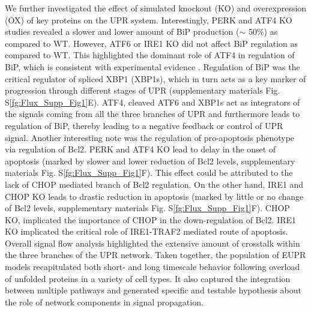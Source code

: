 \documentclass[12pt]{article}
\begin{document}
We further investigated the effect of simulated knockout (KO) and overexpression (OX) of key proteins on the UPR system. Interestingly, PERK and ATF4 KO studies revealed a slower and lower amount of BiP production ($\sim$ 50\%) as compared to WT. However, ATF6 or IRE1 KO did not affect BiP regulation as compared to WT. This highlighted the dominant role of ATF4 in regulation of BiP, which is consistent with experimental evidence \cite{ma2003delineation}. Regulation of BiP was the critical regulator of spliced XBP1 (XBP1s), which in turn acts as a key marker of progression through different stages of UPR (supplementary materials Fig. S\ref{fg:Flux_Supp_Fig1}E). ATF4, cleaved ATF6 and XBP1s act as integrators of the signals coming from all the three branches of UPR and furthermore leads to regulation of BiP, thereby leading to a negative feedback or control of UPR signal. Another interesting note was the regulation of pro-apoptosis phenotype via regulation of Bcl2. PERK and ATF4 KO lead to delay in the onset of apoptosis (marked by slower and lower reduction of Bcl2 levels, supplementary materials Fig. S\ref{fg:Flux_Supp_Fig1}F). This effect could be attributed to the lack of CHOP mediated branch of Bcl2 regulation. On the other hand, IRE1 and CHOP KO leads to drastic reduction in apoptosis (marked by little or no change of Bcl2 levels, supplementary materials Fig. S\ref{fg:Flux_Supp_Fig1}F). CHOP KO, implicated the importance of CHOP in the down-regulation of Bcl2. IRE1 KO implicated the critical role of IRE1-TRAF2 mediated route of apoptosis. Overall signal flow analysis highlighted the extensive amount of crosstalk within the three branches of the UPR network. Taken together, the population of EUPR models recapitulated both short- and long timescale behavior following overload of unfolded proteins in a variety of cell types. It also captured the integration between multiple pathways and generated specific and testable hypothesis about the role of network components in signal propagation.    
\end{document}

